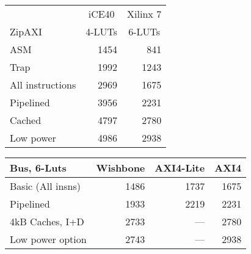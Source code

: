 \documentclass{article}
\begin{document}
\begin{center}\begin{tabular}{|l|r|r|}\hline
 & \multicolumn{1}{c|}{iCE40} & \multicolumn{1}{|c|}{Xilinx 7} \\
ZipAXI & \multicolumn{1}{c|}{4-LUTs} & \multicolumn{1}{|c|}{6-LUTs}\\\hline\hline
ASM			& 1454 &  841 \\\hline
Trap			& 1992 & 1243 \\\hline
All instructions	& 2969 & 1675 \\\hline
Pipelined		& 3956 & 2231 \\\hline
Cached			& 4797 & 2780 \\\hline
Low power		& 4986 & 2938 \\\hline
\end{tabular}\end{center}


\begin{center}\begin{tabular}{|l|r|r|r|}\hline
Bus, 6-Luts & \multicolumn{1}{|c|}{Wishbone} & \multicolumn{1}{|c|}{AXI4-Lite}
		& \multicolumn{1}{|c|}{AXI4} \\\hline\hline
Basic (All insns)	& 1486 & 1737 & 1675 \\\hline
Pipelined		& 1933 & 2219 & 2231 \\\hline
4kB Caches, I+D		& 2733 &  --- & 2780 \\\hline
Low power option	& 2743 &  --- & 2938 \\\hline
\end{tabular}\end{center}
\end{document}

